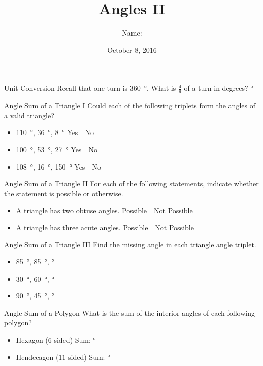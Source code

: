 \documentclass[14pt,letterpaper]{article}
\title{Angles II}
\author{Name: \underline{\hspace{5cm}}}
\date{October 8, 2016}
\begin{document}
\HomeworkTitle

\thispagestyle{empty}

\begin{problem}{Unit Conversion}
  Recall that one turn is \SI{360}{\degree}. What is \(\frac{4}{9}\) of a turn
  in degrees? \hfill \blankE \si{\degree}
\end{problem}

\begin{problem}{Angle Sum of a Triangle I}
 Could each of the following triplets form the angles of a valid triangle?

 \begin{itemize}
  \item \SI{110}{\degree}, \SI{36}{\degree}, \SI{8}{\degree}
  \hfill Yes~~No
  \item \SI{100}{\degree}, \SI{53}{\degree}, \SI{27}{\degree}
  \hfill Yes~~No
  \item \SI{108}{\degree}, \SI{16}{\degree}, \SI{150}{\degree}
  \hfill Yes~~No
 \end{itemize}
\end{problem}

\begin{problem}{Angle Sum of a Triangle II}
 For each of the following statements, indicate whether the statement is
 possible or otherwise.

 \begin{itemize}
  \item A triangle has two obtuse angles.
  \hfill Possible~~Not Possible
  \item A triangle has three acute angles.
  \hfill Possible~~Not Possible
 \end{itemize}
\end{problem}

\begin{problem}{Angle Sum of a Triangle III}
 Find the missing angle in each triangle angle triplet.

 \begin{itemize}
  \item \SI{85}{\degree}, \SI{85}{\degree},
  \blankC \si{\degree}
  \item \SI{30}{\degree}, \SI{60}{\degree},
  \blankC \si{\degree}
  \item \SI{90}{\degree}, \SI{45}{\degree},
  \blankC \si{\degree}
 \end{itemize}
\end{problem}

\begin{problem}{Angle Sum of a Polygon}
 What is the sum of the interior angles of each following polygon?

 \begin{itemize}
  \item Hexagon ($6$-sided)
  \hfill Sum: \blankC \si{\degree}
  \item Hendecagon ($11$-sided)
  \hfill Sum: \blankC \si{\degree}
 \end{itemize}
\end{problem}
\end{document}
